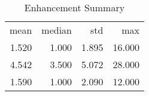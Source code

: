 \begin{table}[ht]
\centering
\caption{Enhancement Summary} 
\begin{tabular}{rrrr}
 mean & median & std & max \\ 
 1.520 & 1.000 & 1.895 & 16.000 \\ 
   \hline
4.542 & 3.500 & 5.072 & 28.000 \\ 
  1.590 & 1.000 & 2.090 & 12.000 \\ 
  \end{tabular}
  \label{tab:sumenhance}
\end{table}
